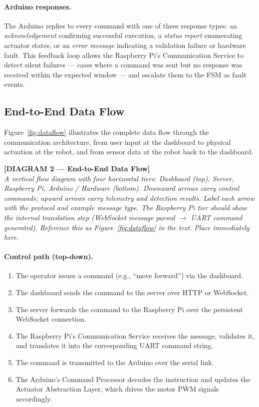 \paragraph{Arduino responses.}
The Arduino replies to every command with one of three response types:
an \emph{acknowledgement} confirming successful execution, a
\emph{status report} enumerating actuator states, or an \emph{error
message} indicating a validation failure or hardware fault. This
feedback loop allows the Raspberry Pi's Communication Service to
detect silent failures — cases where a command was sent but no
response was received within the expected window — and escalate them
to the FSM as fault events.
 
\subsection{End-to-End Data Flow}
 
Figure~\ref{fig:dataflow} illustrates the complete data flow through
the communication architecture, from user input at the dashboard to
physical actuation at the robot, and from sensor data at the robot
back to the dashboard.
 
\bigskip
\noindent\textbf{[DIAGRAM 2 — End-to-End Data Flow]}\\
\textit{A vertical flow diagram with four horizontal tiers: Dashboard
(top), Server, Raspberry Pi, Arduino / Hardware (bottom). Downward
arrows carry control commands; upward arrows carry telemetry and
detection results. Label each arrow with the protocol and example
message type. The Raspberry Pi tier should show the internal
translation step (WebSocket message parsed $\to$ UART command
generated). Reference this as Figure~\ref{fig:dataflow} in the text.
Place immediately here.}
\label{fig:dataflow}
\bigskip
 
\paragraph{Control path (top-down).}
\begin{enumerate}
    \item The operator issues a command (e.g., ``move forward'') via
          the dashboard.
    \item The dashboard sends the command to the server over HTTP or
          WebSocket.
    \item The server forwards the command to the Raspberry Pi over the
          persistent WebSocket connection.
    \item The Raspberry Pi's Communication Service receives the message,
          validates it, and translates it into the corresponding UART
          command string.
    \item The command is transmitted to the Arduino over the serial
          link.
    \item The Arduino's Command Processor decodes the instruction and
          updates the Actuator Abstraction Layer, which drives the
          motor PWM signals accordingly.
\end{enumerate}
 
